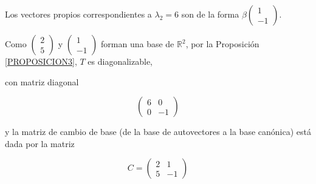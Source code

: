 \begin{example}
\begin{enumerate}
 Los vectores propios correspondientes a $\lambda_2= 6$  son de la forma $ \beta  \left(\begin{array}{c}  1  \\ -1 
\end{array}
 \right)$.
 \end{enumerate}
 
\bigskip


 Como $  \left(\begin{array}{c}  2  \\ 5 
\end{array}
 \right)$  y $  \left(\begin{array}{c}  1  \\ -1 
\end{array}
 \right)$  forman una base de $\mathbb{R}^2$, por la Proposición \ref{PROPOSICION3},  $T$ es diagonalizable, 
 
 \bigskip

 \bigskip
 
 \noindent
 con matriz diagonal 

 $$\left(\begin{array}{cc}  6 & 0  \\ 0 &  -1
\end{array}
 \right)$$
 
 \bigskip

 
\noindent
 y la matriz de  cambio de base (de la base de autovectores a la base canónica) está dada por la matriz

 $$C=\left(\begin{array}{cc}  2 & 1  \\ 5 &  -1
\end{array}
 \right)$$
\end{example}


